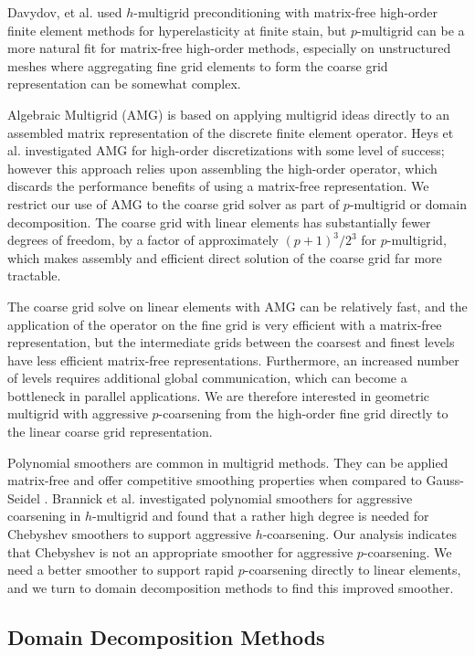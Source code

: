 Davydov, et al. \cite{davydov2019matrix} used $h$-multigrid preconditioning with matrix-free high-order finite element methods for hyperelasticity at finite stain, but $p$-multigrid can be a more natural fit for matrix-free high-order methods, especially on unstructured meshes where aggregating fine grid elements to form the coarse grid representation can be somewhat complex.

Algebraic Multigrid (AMG) is based on applying multigrid ideas directly to an assembled matrix representation of the discrete finite element operator.
Heys et al. \cite{heys2005algebraic} investigated AMG for high-order discretizations with some level of success; however this approach relies upon assembling the high-order operator, which discards the performance benefits of using a matrix-free representation.
We restrict our use of AMG to the coarse grid solver as part of $p$-multigrid or domain decomposition.
The coarse grid with linear elements has substantially fewer degrees of freedom, by a factor of approximately $\left( p + 1 \right)^3 / 2^3$ for $p$-multigrid, which makes assembly and efficient direct solution of the coarse grid far more tractable.

The coarse grid solve on linear elements with AMG can be relatively fast, and the application of the operator on the fine grid is very efficient with a matrix-free representation, but the intermediate grids between the coarsest and finest levels have less efficient matrix-free representations.
Furthermore, an increased number of levels requires additional global communication, which can become a bottleneck in parallel applications.
We are therefore interested in geometric multigrid with aggressive $p$-coarsening from the high-order fine grid directly to the linear coarse grid representation.

Polynomial smoothers are common in multigrid methods.
They can be applied matrix-free and offer competitive smoothing properties when compared to Gauss-Seidel \cite{adams2003parallel}.
Brannick et al. \cite{brannick2015polynomial} investigated polynomial smoothers for aggressive coarsening in $h$-multigrid and found that a rather high degree is needed for Chebyshev smoothers to support aggressive $h$-coarsening.
Our analysis indicates that Chebyshev is not an appropriate smoother for aggressive $p$-coarsening.
We need a better smoother to support rapid $p$-coarsening directly to linear elements, and we turn to domain decomposition methods to find this improved smoother.

\subsection{Domain Decomposition Methods}

